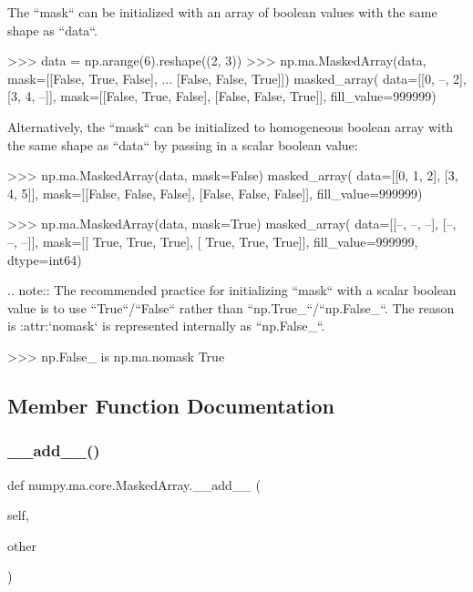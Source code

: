 \begin{DoxyVerb}
The ``mask`` can be initialized with an array of boolean values
with the same shape as ``data``.

>>> data = np.arange(6).reshape((2, 3))
>>> np.ma.MaskedArray(data, mask=[[False, True, False],
...                               [False, False, True]])
masked_array(
  data=[[0, --, 2],
        [3, 4, --]],
  mask=[[False,  True, False],
        [False, False,  True]],
  fill_value=999999)

Alternatively, the ``mask`` can be initialized to homogeneous boolean
array with the same shape as ``data`` by passing in a scalar
boolean value:

>>> np.ma.MaskedArray(data, mask=False)
masked_array(
  data=[[0, 1, 2],
        [3, 4, 5]],
  mask=[[False, False, False],
        [False, False, False]],
  fill_value=999999)

>>> np.ma.MaskedArray(data, mask=True)
masked_array(
  data=[[--, --, --],
        [--, --, --]],
  mask=[[ True,  True,  True],
        [ True,  True,  True]],
  fill_value=999999,
  dtype=int64)

.. note::
    The recommended practice for initializing ``mask`` with a scalar
    boolean value is to use ``True``/``False`` rather than
    ``np.True_``/``np.False_``. The reason is :attr:`nomask`
    is represented internally as ``np.False_``.

    >>> np.False_ is np.ma.nomask
    True\end{DoxyVerb}
 

\subsection{Member Function Documentation}
\mbox{\label{classnumpy_1_1ma_1_1core_1_1MaskedArray_a5e0ec7fdd42ee3d912b7942c9f2f83aa}} 
\subsubsection{\texorpdfstring{\+\_\+\+\_\+add\+\_\+\+\_\+()}{\_\_add\_\_()}}
{\footnotesize\ttfamily def numpy.\+ma.\+core.\+Masked\+Array.\+\_\+\+\_\+add\+\_\+\+\_\+ (\begin{DoxyParamCaption}\item[{}]{self,  }\item[{}]{other }\end{DoxyParamCaption})}

